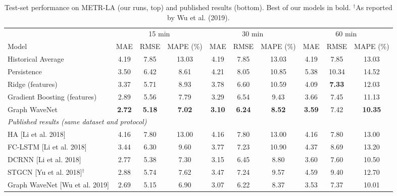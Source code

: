 \begin{table}[t]
\centering
\caption{Test-set performance on METR-LA (our runs, top) and published results (bottom). Best of our models in bold. $^\dagger$As reported by Wu et al. (2019).}
\label{tab:main}
\setlength{\tabcolsep}{4pt}
\begin{tabular}{lccccccccc}
\toprule
 & \multicolumn{3}{c}{15 min} & \multicolumn{3}{c}{30 min} & \multicolumn{3}{c}{60 min} \\
\cmidrule(lr){2-4} \cmidrule(lr){5-7} \cmidrule(lr){8-10}
Model & MAE & RMSE & MAPE (\%) & MAE & RMSE & MAPE (\%) & MAE & RMSE & MAPE (\%) \\
\midrule
Historical Average & 4.19 & 7.85 & 13.03 & 4.19 & 7.85 & 13.03 & 4.19 & 7.85 & 13.03 \\
Persistence & 3.50 & 6.42 & 8.61 & 4.21 & 8.05 & 10.85 & 5.38 & 10.34 & 14.52 \\
Ridge (features) & 3.37 & 5.71 & 8.93 & 3.78 & 6.60 & 10.59 & 4.09 & \textbf{7.33} & 12.03 \\
Gradient Boosting (features) & 2.89 & 5.56 & 7.79 & 3.29 & 6.54 & 9.43 & 3.66 & 7.45 & 11.13 \\
Graph WaveNet & \textbf{2.72} & \textbf{5.18} & \textbf{7.02} & \textbf{3.10} & \textbf{6.24} & \textbf{8.52} & \textbf{3.59} & 7.42 & \textbf{10.35} \\
\midrule
\multicolumn{10}{l}{\emph{Published results (same dataset and protocol)}} \\
HA [Li et al. 2018] & 4.16 & 7.80 & 13.00 & 4.16 & 7.80 & 13.00 & 4.16 & 7.80 & 13.00 \\
FC-LSTM [Li et al. 2018] & 3.44 & 6.30 & 9.60 & 3.77 & 7.23 & 10.90 & 4.37 & 8.69 & 13.20 \\
DCRNN [Li et al. 2018] & 2.77 & 5.38 & 7.30 & 3.15 & 6.45 & 8.80 & 3.60 & 7.60 & 10.50 \\
STGCN [Yu et al. 2018]$^\dagger$ & 2.88 & 5.74 & 7.62 & 3.47 & 7.24 & 9.57 & 4.59 & 9.40 & 12.70 \\
Graph WaveNet [Wu et al. 2019] & 2.69 & 5.15 & 6.90 & 3.07 & 6.22 & 8.37 & 3.53 & 7.37 & 10.01 \\
\bottomrule
\end{tabular}
\end{table}